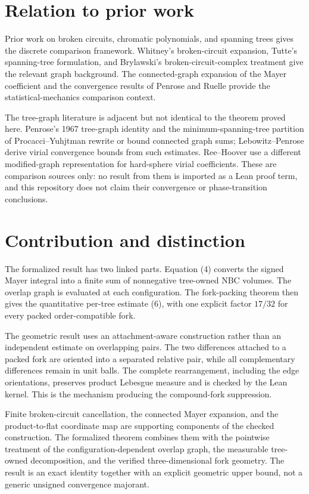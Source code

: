 \documentclass[11pt]{article}
\newcommand{\1}{\mathbf{1}}
\begin{document}
\section{Relation to prior work}

Prior work on broken circuits, chromatic polynomials, and spanning trees gives
the discrete comparison framework.  Whitney's broken-circuit expansion,
Tutte's spanning-tree formulation, and Brylawski's broken-circuit-complex
treatment give the relevant graph background.  The connected-graph expansion
of the Mayer coefficient and the convergence results of Penrose and Ruelle
provide the statistical-mechanics comparison context.

The tree-graph literature is adjacent but not identical to the theorem proved
here.  Penrose's 1967 tree-graph identity and the minimum-spanning-tree
partition of Procacci--Yuhjtman rewrite or bound connected graph sums;
Lebowitz--Penrose derive virial convergence bounds from such estimates.
Ree--Hoover use a different modified-graph representation for hard-sphere
virial coefficients.  These are comparison sources only: no result from them
is imported as a Lean proof term, and this repository does not claim their
convergence or phase-transition conclusions.

\section{Contribution and distinction}

The formalized result has two linked parts.  Equation (4) converts the signed
Mayer integral into a finite sum of nonnegative tree-owned NBC volumes.  The
overlap graph is evaluated at each configuration.  The fork-packing theorem
then gives the quantitative
per-tree estimate (6), with one explicit factor $17/32$ for every packed
order-compatible fork.

The geometric result uses an attachment-aware construction rather than an
independent estimate on overlapping pairs.  The two differences attached to a
packed fork are oriented into a separated relative pair, while all complementary
differences remain in unit balls.  The complete rearrangement, including the
edge orientations, preserves product Lebesgue measure and is checked by the
Lean kernel.  This is the mechanism producing the compound-fork suppression.

Finite broken-circuit cancellation, the connected Mayer expansion, and the
product-to-flat coordinate map are supporting components of the checked
construction.  The formalized theorem combines them with the pointwise
treatment of the configuration-dependent overlap graph, the measurable
tree-owned decomposition, and the verified three-dimensional fork geometry.
The result is an exact identity together with an explicit geometric upper
bound, not a generic unsigned convergence majorant.
\end{document}
